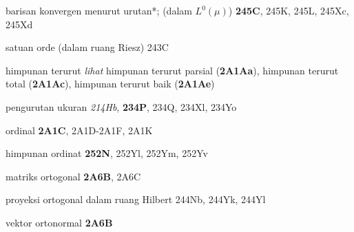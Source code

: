 barisan konvergen menurut urutan*; (dalam $L^0(\mu)$) {\bf 245C}, 245K, 245L, 245Xc, 245Xd
































satuan orde (dalam ruang Riesz) 243C






himpunan terurut {\it lihat} himpunan terurut parsial ({\bf 2A1Aa}), himpunan terurut total ({\bf 2A1Ac}), himpunan terurut baik ({\bf 2A1Ae})


pengurutan ukuran {\it 214Hb}, 
{\bf 234P}, 234Q, 234Xl, 234Yo


ordinal {\bf 2A1C}, 2A1D-2A1F, 
2A1K










himpunan ordinat {\bf 252N}, 252Yl, 252Ym, 252Yv














matriks ortogonal {\bf 2A6B}, 2A6C


proyeksi ortogonal dalam ruang Hilbert 244Nb, 244Yk, 244Yl






vektor ortonormal {\bf 2A6B}
















